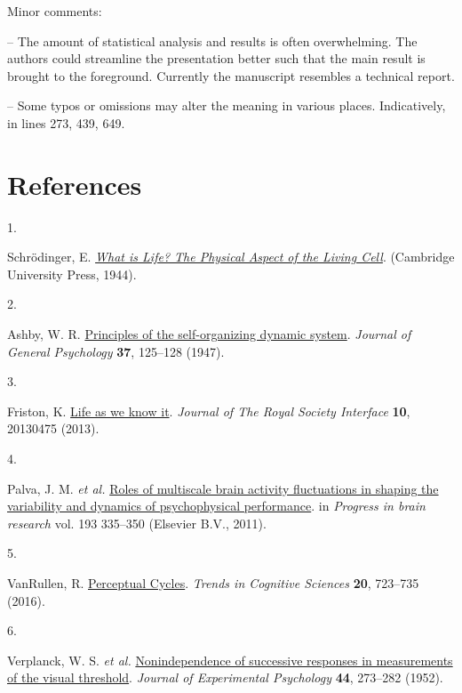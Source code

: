 \documentclass[
]{article}
\newlength{\cslhangindent}
\newlength{\csllabelwidth}
\newlength{\cslentryspacingunit} %
\newenvironment{CSLReferences}[2] %
 {%
  \setlength{\parindent}{0pt}
  \ifodd #1
  \let\oldpar\par
  \def\par{\hangindent=\cslhangindent\oldpar}
  \fi
  \setlength{\parskip}{#2\cslentryspacingunit}
 }%
 {}
\newcommand{\CSLLeftMargin}[1]{\parbox[t]{\csllabelwidth}{#1}}
\newcommand{\CSLRightInline}[1]{\parbox[t]{\linewidth - \csllabelwidth}{#1}\break}
\begin{document}
Minor comments:

-- The amount of statistical analysis and results is often overwhelming.
The authors could streamline the presentation better such that the main
result is brought to the foreground. Currently the manuscript resembles
a technical report.

-- Some typos or omissions may alter the meaning in various places.
Indicatively, in lines 273, 439, 649.

\newpage

\hypertarget{references}{%
\section*{References}\label{references}}

\hypertarget{refs}{}
\begin{CSLReferences}{0}{0}
\leavevmode{}%
\CSLLeftMargin{1. }%
\CSLRightInline{Schrödinger, E.
\emph{\href{http://filf.pskgu.ru/ebooks/schbio/schbio_titul.pdf}{{What
is Life? The Physical Aspect of the Living Cell}}}. (Cambridge
University Press, 1944).}

\leavevmode{}%
\CSLLeftMargin{2. }%
\CSLRightInline{Ashby, W. R.
\href{https://doi.org/10.1080/00221309.1947.9918144}{{Principles of the
self-organizing dynamic system}}. \emph{Journal of General Psychology}
\textbf{37}, 125--128 (1947).}

\leavevmode{}%
\CSLLeftMargin{3. }%
\CSLRightInline{Friston, K.
\href{https://doi.org/10.1098/rsif.2013.0475}{{Life as we know it}}.
\emph{Journal of The Royal Society Interface} \textbf{10}, 20130475
(2013).}

\leavevmode{}%
\CSLLeftMargin{4. }%
\CSLRightInline{Palva, J. M. \emph{et al.}
\href{https://doi.org/10.1016/B978-0-444-53839-0.00022-3}{{Roles of
multiscale brain activity fluctuations in shaping the variability and
dynamics of psychophysical performance}}. in \emph{Progress in brain
research} vol. 193 335--350 (Elsevier B.V., 2011).}

\leavevmode{}%
\CSLLeftMargin{5. }%
\CSLRightInline{VanRullen, R.
\href{https://doi.org/10.1016/j.tics.2016.07.006}{{Perceptual Cycles}}.
\emph{Trends in Cognitive Sciences} \textbf{20}, 723--735 (2016).}

\leavevmode{}%
\CSLLeftMargin{6. }%
\CSLRightInline{Verplanck, W. S. \emph{et al.}
\href{https://doi.org/10.1037/h0054948}{{Nonindependence of successive
responses in measurements of the visual threshold}}. \emph{Journal of
Experimental Psychology} \textbf{44}, 273--282 (1952).}


\end{CSLReferences}
\end{document}
